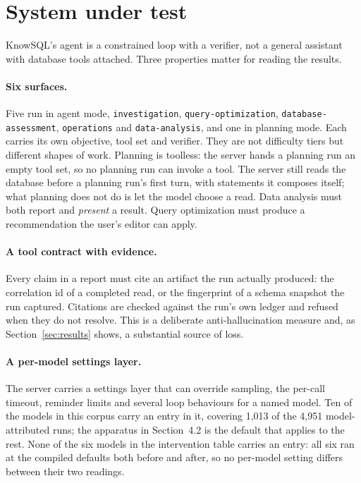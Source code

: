 \documentclass[11pt]{article}
\newcommand{\code}[1]{\texttt{\small #1}}
\begin{document}
\section{System under test}

KnowSQL's agent is a constrained loop with a verifier, not a general assistant with database tools
attached. Three properties matter for reading the results.

\paragraph{Six surfaces.} Five run in agent mode, \code{investigation}, \code{query-optimization},
\code{database-assessment}, \code{operations} and \code{data-analysis}, and one in planning mode. Each carries
its own objective, tool set and verifier. They are not difficulty tiers but different shapes of work. Planning is
toolless: the server hands a planning run an empty tool set, so no planning run can invoke a tool. The server
still reads the database before a planning run's first turn, with statements it composes itself; what planning
does not do is let the model choose a read. Data analysis must both report and \emph{present} a result. Query optimization must
produce a recommendation the user's editor can apply.

\paragraph{A tool contract with evidence.} Every claim in a report must cite an artifact the run actually
produced: the correlation id of a completed read, or the fingerprint of a schema snapshot the run captured.
Citations are checked against the run's own ledger and refused when they do not resolve. This is a deliberate
anti-hallucination measure and, as Section~\ref{sec:results} shows, a substantial source of loss.

\paragraph{A per-model settings layer.}
The server carries a settings layer that can override sampling, the per-call timeout, reminder limits and several
loop behaviours for a named model. Ten of the models in this corpus carry an entry in it, covering 1{,}013 of the
4{,}951 model-attributed runs; the apparatus in Section~4.2 is the default that applies to the rest. None of the
six models in the intervention table carries an entry: all six ran at the compiled defaults both before and
after, so no per-model setting differs between their two readings.
\end{document}

